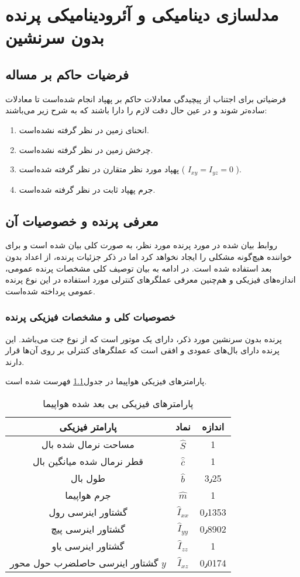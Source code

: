 \chapter[مدلسازی دینامیکی و آئرودینامیکی]{ مدلسازی دینامیکی و آئرودینامیکی پرنده بدون سرنشین}\label{Chap:2}

\section{فرضیات حاکم بر مساله} 
فرضیاتی برای اجتناب از پیچیدگی معادلات حاکم بر پهپاد انجام شده‌است تا معادلات ساده‌تر شوند و در عین حال دقت لازم را دارا باشند که به شرح زیر می‌باشند: 
\begin{enumerate}
 \item انحنای زمین در نظر گرفته نشده‌است.
 \item چرخش زمین در نظر گرفته نشده‌است.
 \item  پهپاد مورد نظر متقارن در نظر گرفته شده‌است ( $  I_{xy}=I_{yz} =0$ ).
 \item جرم پهپاد ثابت در نظر گرفته شده‌است.
\end{enumerate}
\section{معرفی پرنده و خصوصیات آن}
روابط بیان شده در مورد پرنده مورد نظر، به صورت کلی بیان شده است و برای خواننده هیچ‌گونه مشکلی را ایجاد نخواهد کرد اما در ذکر جزئیات پرنده، از اعداد بدون بعد استفاده شده است.
 در ادامه به بیان توصیف کلی مشخصات پرنده عمومی، اندازه‌های فیزیکی و هم‌چنین معرفی عملگرهای کنترلی مورد استفاده در این نوع پرنده عمومی پرداخته شده‌است.
\subsection{خصوصیات کلی و مشخصات فیزیکی پرنده}
پرنده بدون سرنشین مورد ذکر، دارای یک موتور است که از نوع جت می‌باشد.
این پرنده دارای بال‌های عمودی و افقی است که عملگرهای کنترلی بر روی آن‌ها قرار دارند.

 پارامترهای فیزیکی هواپیما در جدول\ref{table:UAVParameters} فهرست شده است.
\begin{table}
\centering%
\caption{پارامترهای فیزیکی بی بعد شده هواپیما}\label{table:UAVParameters}
\begin{tabular}{|c|c|c|}
\hline
پارامتر فیزیکی & نماد & اندازه\\
  \hline
   مساحت نرمال شده بال & $\hat{S}$ & 1 \\
   \hline
  قطر نرمال شده میانگین بال & $ \hat{\overline{c}}$ & 1\\
   \hline
  طول بال & $\hat{b}$  & 3٫25\\ 
 \hline
  جرم هواپیما & $\hat{m}$ & 1\\
 \hline
  گشتاور اینرسی رول & $\hat{I}_{xx}$ & 0٫1353\\ 
 \hline
  گشتاور اینرسی پیچ & $\hat{I}_{yy}$ & 0٫8902\\
 \hline
گشتاور اینرسی یاو & $\hat{I}_{zz}$ & 1\\
 \hline
گشتاور اینرسی حاصلضرب حول محور $y$  & $\hat{I}_{xz}$ & 0٫0174\\
 \hline
\end{tabular}
\end{table}
